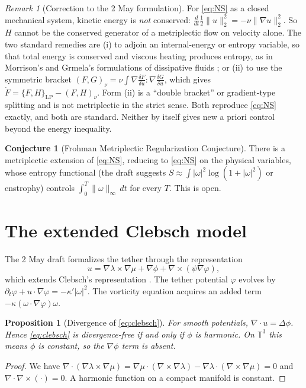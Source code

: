 \documentclass[11pt]{amsart}
\newtheorem{proposition}[theorem]{Proposition}
\theoremstyle{definition}
\newtheorem{conjecture}[theorem]{Conjecture}
\theoremstyle{remark}
\newtheorem{remark}[theorem]{Remark}
\newcommand{\T}{\mathbb{T}}
\begin{document}
\begin{remark}[Correction to the 2 May formulation]
For \eqref{eq:NS} as a closed mechanical system, kinetic energy is \emph{not} conserved: $\frac{d}{dt}\tfrac12\|u\|_2^2=-\nu\|\nabla u\|_2^2$. So $H$ cannot be the conserved generator of a metriplectic flow on velocity alone. The two standard remedies are (i) to adjoin an internal-energy or entropy variable, so that total energy is conserved and viscous heating produces entropy, as in Morrison's and Grmela's formulations of dissipative fluids \cite{Morrison1984,Grmela1984}; or (ii) to use the symmetric bracket $(F,G)_\nu=\nu\int\nabla\frac{\delta F}{\delta u}:\nabla\frac{\delta G}{\delta u}$, which gives $\dot F=\{F,H\}_{\mathrm{LP}}-(F,H)_\nu$. Form (ii) is a ``double bracket'' or gradient-type splitting and is not metriplectic in the strict sense. Both reproduce \eqref{eq:NS} exactly, and both are standard. Neither by itself gives new a priori control beyond the energy inequality.
\end{remark}

\begin{conjecture}[Frohman Metriplectic Regularization Conjecture]
There is a metriplectic extension of \eqref{eq:NS}, reducing to \eqref{eq:NS} on the physical variables, whose entropy functional (the draft suggests $S\approx\int|\omega|^2\log(1+|\omega|^2)$ or enstrophy) controls $\int_0^T\|\omega\|_\infty\,dt$ for every $T$. This is open.
\end{conjecture}

\section{The extended Clebsch model}
The 2 May draft formalizes the tether through the representation
\begin{equation}\label{eq:clebsch}
u=\nabla\lambda\times\nabla\mu+\nabla\phi+\nabla\times(\psi\nabla\varphi),
\end{equation}
which extends Clebsch's representation \cite{Clebsch1859}. The tether potential $\varphi$ evolves by $\partial_t\varphi+u\cdot\nabla\varphi=-\kappa'|\omega|^2$. The vorticity equation acquires an added term $-\kappa(\omega\cdot\nabla\varphi)\omega$.

\begin{proposition}[Divergence of \eqref{eq:clebsch}]\label{prop:div}
For smooth potentials, $\nabla\cdot u=\Delta\phi$. Hence \eqref{eq:clebsch} is divergence-free if and only if $\phi$ is harmonic. On $\T^3$ this means $\phi$ is constant, so the $\nabla\phi$ term is absent.
\end{proposition}
\begin{proof}
We have $\nabla\cdot(\nabla\lambda\times\nabla\mu)=\nabla\mu\cdot(\nabla\times\nabla\lambda)-\nabla\lambda\cdot(\nabla\times\nabla\mu)=0$ and $\nabla\cdot\nabla\times(\cdot)=0$. A harmonic function on a compact manifold is constant.
\end{proof}
\end{document}
